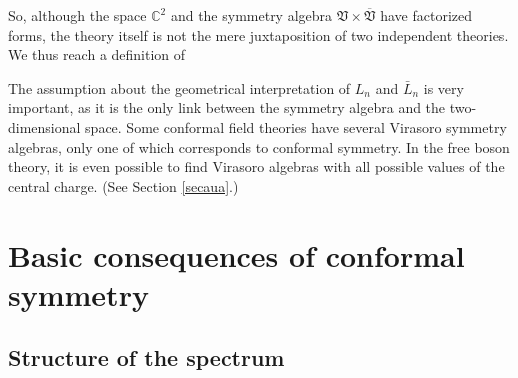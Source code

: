 \documentclass[12pt, a4paper, notitlepage, twoside]{report}
\numberwithin{equation}{section}
\theoremstyle{break}
\begin{document}
So, although the space ${\mathbb{C}}^2$ and the symmetry algebra $\mathfrak{V}\times \overline{\mathfrak{V}}$  have factorized forms, the theory itself is not the mere juxtaposition of two independent theories. 
We thus reach a definition of 
\begin{center}
\end{center}
The assumption about the geometrical interpretation of $L_n$ and $\bar{L}_n$ is very important, as it is the only link between the symmetry algebra and the two-dimensional space.
Some conformal field theories have several Virasoro symmetry algebras, only one of which corresponds to conformal symmetry.
In the free boson theory, it is even possible to find Virasoro algebras with all possible values of the central charge. (See Section \ref{secaua}.)


\section{Basic consequences of conformal symmetry}

\subsection{Structure of the spectrum \label{secsots}}
\end{document}

